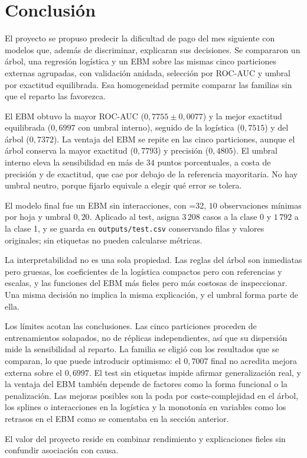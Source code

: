 \section{Conclusión}\label{sec:conclusion}

El proyecto se propuso predecir la dificultad de pago del mes siguiente con modelos que, además de discriminar, explicaran sus decisiones. Se compararon un árbol, una regresión logística y un EBM sobre las mismas cinco particiones externas agrupadas, con validación anidada, selección por ROC-AUC y umbral por exactitud equilibrada. Esa homogeneidad permite comparar las familias sin que el reparto las favorezca.

El EBM obtuvo la mayor ROC-AUC ($0{,}7755 \pm 0{,}0077$) y la mejor exactitud equilibrada ($0{,}6997$ con umbral interno), seguido de la logística ($0{,}7515$) y del árbol ($0{,}7372$). La ventaja del EBM se repite en las cinco particiones, aunque el árbol conserva la mayor exactitud ($0{,}7793$) y precisión ($0{,}4805$). El umbral interno eleva la sensibilidad en más de $34$ puntos porcentuales, a costa de precisión y de exactitud, que cae por debajo de la referencia mayoritaria. No hay umbral neutro, porque fijarlo equivale a elegir qué error se tolera.

El modelo final fue un EBM sin interacciones, con =32, $10$ observaciones mínimas por hoja y umbral $0{,}20$. Aplicado al test, asigna $3\,208$ casos a la clase 0 y $1\,792$ a la clase 1, y se guarda en \texttt{outputs/test.csv} conservando filas y valores originales; sin etiquetas no pueden calcularse métricas.

La interpretabilidad no es una sola propiedad. Las reglas del árbol son inmediatas pero gruesas, los coeficientes de la logística compactos pero con referencias y escalas, y las funciones del EBM más fieles pero más costosas de inspeccionar. Una misma decisión no implica la misma explicación, y el umbral forma parte de ella.

Los límites acotan las conclusiones. Las cinco particiones proceden de entrenamientos solapados, no de réplicas independientes, así que su dispersión mide la sensibilidad al reparto. La familia se eligió con los resultados que se comparan, lo que puede introducir optimismo: el $0{,}7007$ final no acredita mejora externa sobre el $0{,}6997$. El test sin etiquetas impide afirmar generalización real, y la ventaja del EBM también depende de factores como la forma funcional o la penalización. Las mejoras posibles son la poda por coste-complejidad en el árbol, los splines o interacciones en la logística y la monotonía en variables como los retrasos en el EBM como se comentaba en la sección anterior.

El valor del proyecto reside en combinar rendimiento y explicaciones fieles sin confundir asociación con causa.
